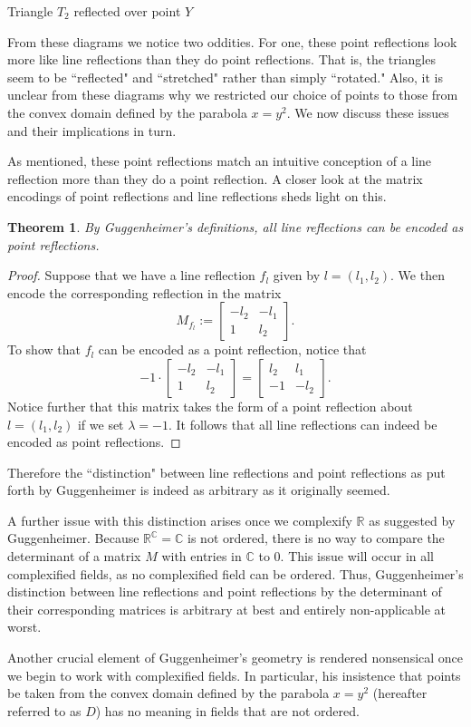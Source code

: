 \documentclass[12pt]{article}
\newcommand{\R}{\mathbb{R}}
\newcommand{\C}{\mathbb{C}}
\newcommand{\lftmat}[4]{\begin{bmatrix} {#1} & {#2} \\ {#3} & {#4} \end{bmatrix}}
\newcommand{\linenoendmat}[2]{\begin{bmatrix} -{#2} & -{#1} \\ 1 & {#2} \end{bmatrix}}
\newcommand{\stanlinenoendmat}{\linenoendmat{l_1}{l_2}}
\theoremstyle{plain}
\newtheorem{theorem}{Theorem}[section]
\theoremstyle{definition}
\begin{document}
\begin{center}
Triangle $T_2$ reflected over point $Y$ 
\end{center}


From these diagrams we notice two oddities. For one, these point reflections look more like line reflections than they do point reflections. That is, the triangles seem to be ``reflected" and ``stretched" rather than simply ``rotated." Also, it is unclear from these diagrams why we restricted our choice of points to those from the convex domain defined by the parabola $x = y^2$. We now discuss these issues and their implications in turn.

As mentioned, these point reflections match an intuitive conception of a line reflection more than they do a point reflection. A closer look at the matrix encodings of point reflections and line reflections sheds light on this. 

\begin{theorem}
By Guggenheimer's definitions, all line reflections can be encoded as point reflections. 
\end{theorem}

\begin{proof}
Suppose that we have a line reflection $f_l$ given by $l = (l_1, l_2)$. We then encode the corresponding reflection in the matrix 
\[ M_{f_l} := \stanlinenoendmat. \]
To show that $f_l$ can be encoded as a point reflection, notice that 
\[ -1 \cdot \stanlinenoendmat = \lftmat{l_2}{l_1}{-1}{-l_2}.\]
Notice further that this matrix takes the form of a point reflection about $l = (l_1, l_2)$ if we set $\lambda = -1$. It follows that all line reflections can indeed be encoded as point reflections.
\end{proof}

Therefore the ``distinction" between line reflections and point reflections as put forth by Guggenheimer is indeed as arbitrary as it originally seemed. 

A further issue with this distinction arises once we complexify $\R$ as suggested by Guggenheimer. Because $\R^{\C} = \C$ is not ordered, there is no way to compare the determinant of a matrix $M$ with entries in $\C$ to 0. This issue will occur in all complexified fields, as no complexified field can be ordered\cite{marsden_complex_book}. Thus, Guggenheimer's distinction between line reflections and point reflections by the determinant of their corresponding matrices is arbitrary at best and entirely non-applicable at worst.

Another crucial element of Guggenheimer's geometry is rendered nonsensical once we begin to work with complexified fields. In particular, his insistence that points be taken from the convex domain defined by the parabola $x = y^2$ (hereafter referred to as $D$) has no meaning in fields that are not ordered.
\end{document}
